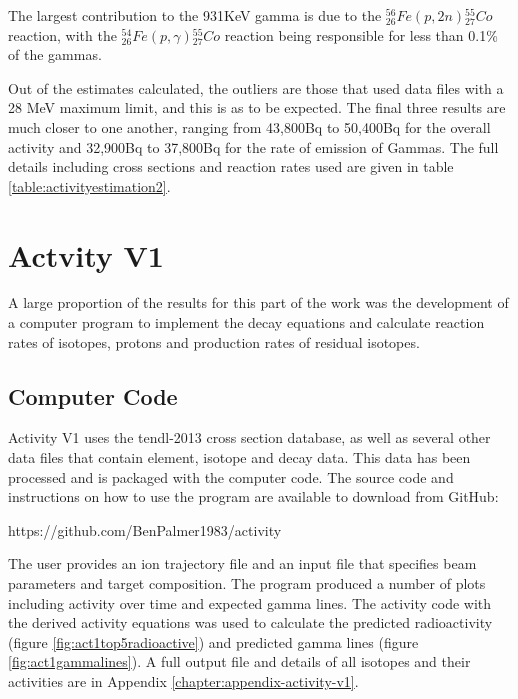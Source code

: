 The largest contribution to the 931KeV gamma is due to the ${}^{56}_{26} Fe (p, 2n) {}^{55}_{27} Co$
reaction, with the ${}^{54}_{26} Fe (p, \gamma) {}^{55}_{27} Co$ reaction being responsible for less than 0.1\% of the gammas.

Out of the estimates calculated, the outliers are those that used data files with a 28 MeV maximum limit, and this is as to be expected.  The final three results are much closer to one another, ranging from 43,800Bq to 50,400Bq for the overall activity and 32,900Bq to 37,800Bq for the rate of emission of Gammas.  The full details including cross sections and reaction rates used are given in table \ref{table:activityestimation2}.


\FloatBarrier


\section{Actvity V1}

A large proportion of the results for this part of the work was the development of a computer program to implement the decay equations and calculate reaction rates of isotopes, protons and production rates of residual isotopes.

\subsection{Computer Code}

Activity V1 uses the \acrshort{tendl}-2013 cross section database, as well as several other data files that contain element, isotope and decay data. This data has been processed and is packaged with the computer code.  The source code and instructions on how to use the program are available to download from GitHub: 

https://github.com/BenPalmer1983/activity

The user provides an ion trajectory file and an input file that specifies beam parameters and target composition.  The program produced a number of plots including activity over time and expected gamma lines.  The activity code with the derived activity equations was used to calculate the predicted radioactivity (figure \ref{fig:act1top5radioactive}) and predicted gamma lines (figure \ref{fig:act1gammalines}).  A full output file and details of all isotopes and their activities are in Appendix \autoref{chapter:appendix-activity-v1}.


